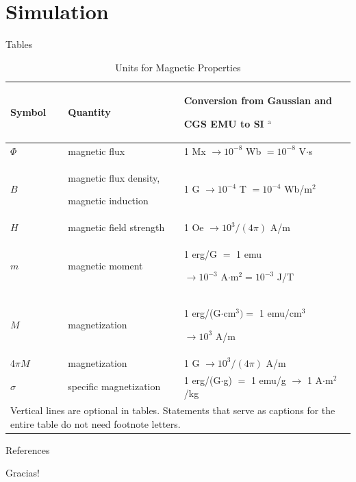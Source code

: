 \documentclass[10pt,hyperref={colorlinks,citecolor=blue,urlcolor=peking_blue,linkcolor=}]{beamer}
\theoremstyle{plain}
\begin{document}
\section{Simulation}

\begin{frame}{Tables}
    \begin{table}
        \caption{Units for Magnetic Properties}
        \label{table}
        \setlength{\tabcolsep}{3pt}
        \begin{tabular}{p{40pt}p{100pt}p{140pt}}
        \hline
        Symbol& 
        Quantity& 
        Conversion from Gaussian and \par CGS EMU to SI $^{\mathrm{a}}$ \\
        \hline
        $\Phi $& 
        magnetic flux& 
        1 Mx $\to  10^{-8}$ Wb $= 10^{-8}$ V$\cdot $s \\
        $B$& 
        magnetic flux density, \par magnetic induction& 
        1 G $\to  10^{-4}$ T $= 10^{-4}$ Wb/m$^{2}$ \\
        $H$& 
        magnetic field strength& 
        1 Oe $\to  10^{3}/(4\pi )$ A/m \\
        $m$& 
        magnetic moment& 
        1 erg/G $=$ 1 emu \par $\to 10^{-3}$ A$\cdot $m$^{2} = 10^{-3}$ J/T \\
        $M$& 
        magnetization& 
        1 erg/(G$\cdot $cm$^{3}) =$ 1 emu/cm$^{3}$ \par $\to 10^{3}$ A/m \\
        4$\pi M$& 
        magnetization& 
        1 G $\to  10^{3}/(4\pi )$ A/m \\
        $\sigma $& 
        specific magnetization& 
        1 erg/(G$\cdot $g) $=$ 1 emu/g $\to $ 1 A$\cdot $m$^{2}$/kg \\
        \hline
        \multicolumn{3}{p{280pt}}{Vertical lines are optional in tables. Statements that serve as captions for 
        the entire table do not need footnote letters. }
        \end{tabular}
        \label{tab1}
    \end{table}
\end{frame}


\begin{frame}{References}%
    \renewcommand*{\bibfont}{\footnotesize}
    
    
\end{frame}

\begin{frame}
    \begin{center}
        {\Huge\calligra Gracias!}
    \end{center}
\end{frame}
\end{document}
